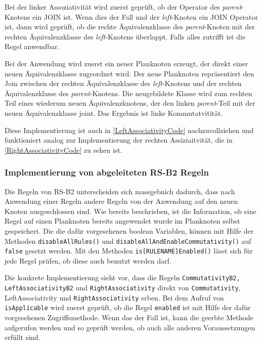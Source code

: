 Bei der linker Assoziativität wird zuerst geprüft, ob der Operator des \textit{parent}-Knotens ein JOIN ist. Wenn dies der Fall und der \textit{left}-Knoten ein JOIN Operator ist, dann wird geprüft, ob die rechte Äquivalenzklasse des \textit{parent}-Knoten mit der rechten Äquivalenzklasse des \textit{left}-Knotens überlappt. Falls alles zutrifft ist die Regel anwendbar.

Bei der Anwendung wird zuerst ein neuer Planknoten erzeugt, der direkt einer neuen Äquivalenzklasse zugeordnet wird. Der neue Planknoten repräsentiert den Join zwischen der rechten Äquivalenzklasse des \textit{left}-Knotens und der rechten Äquivalenzklasse des \textit{parent}-Knotens. Die neugebildete Klasse wird zum rechten Teil eines wiederum neuen Äquivalenzknotens, der den linken \textit{parent}-Teil mit der neuen Äquivalenzklasse joint. Das Ergebnis ist linke Kommutatvitität.

Diese Implementierung ist auch in \ref{LeftAssociativityCode} nachzuvollziehen und funktioniert analog zur Implementierung der rechten Assiziaitvität, die in \ref{RightAssociativityCode} zu sehen ist.






\subsubsection{Implementierung von abgeleiteten RS-B2 Regeln}

Die Regeln von RS-B2 unterscheiden sich massgebnich dadurch, dass nach Anwendung einer Regeln andere Regeln von der Anwendung auf den neuen Knoten ausgeschlossen sind. Wie bereits beschrieben, ist die Information, ob eine Regel auf einen Planknoten bereits angewendet wurde im Planknoten selbst gespeichert. Die die dafür vorgesehenen boolean Variablen, können mit Hilfe der Methoden \texttt{disable\-All\-Rules()} und \texttt{disable\-All\-And\-Enable\-Commutativity()} auf \texttt{false} gesetzt werden. Mit den Methoden \texttt{is[RULENAME]Enabled()} lässt sich für jede Regel prüfen, ob diese auch benutzt werden darf.

Die konkrete Implementierung sieht vor, dass die Regeln \texttt{Commutativity\-B2, Left\-Associativity\-B2} und \texttt{Right\-Associativity} direkt von \texttt{Commutativity}, \texttt{}{Left\-Associativity} und \texttt{Right\-Associativity} erben. Bei dem Aufruf von \texttt{is\-Applicable} wird zuerst geprüft, ob die Regel \texttt{enabled} ist mit Hilfe der dafür vorgesehenen Zugriffsmethode. Wenn das der Fall ist, kann die geerbte Methode aufgerufen werden und so geprüft werden, ob auch alle anderen Voraussetzungen erfüllt sind.

